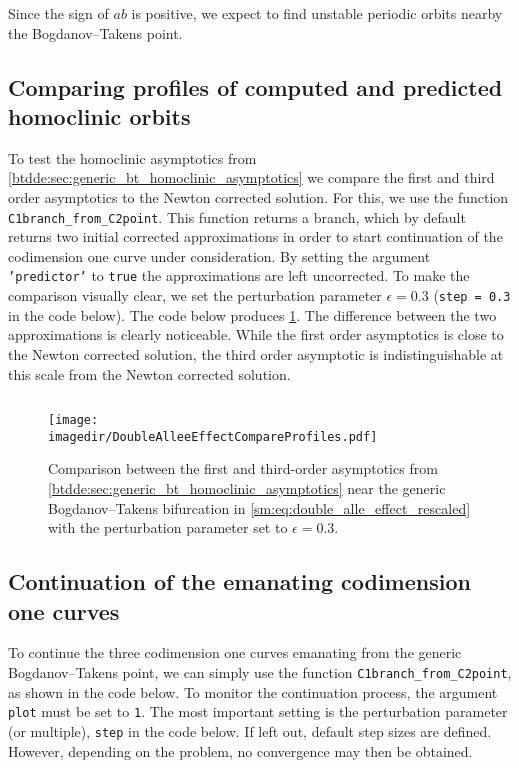 Since the sign of $ab$ is positive, we expect to find unstable periodic orbits nearby the 
Bogdanov--Takens point.

\subsection{Comparing profiles of computed and predicted homoclinic orbits}
To test the homoclinic asymptotics from
\cref{btdde:sec:generic_bt_homoclinic_asymptotics} we compare the first and third
order asymptotics to the Newton corrected solution. For this, we use the 
function \texttt{C1branch_from_C2point}. This function returns a branch, which
by default returns two initial corrected approximations in order to start continuation of the
codimension one curve under consideration. By setting the argument
\texttt{'predictor'} to \texttt{true} the approximations are left uncorrected.
To make the comparison visually clear, we set the perturbation parameter 
$\epsilon=0.3$ (\texttt{step = 0.3} in the code below).
The code below produces \cref{sm:fig:DoubleAlleeEffectCompareProfiles}.
The difference between the two approximations is clearly noticeable. While
the first order asymptotics is close to the Newton corrected solution, the third
order asymptotic is indistinguishable at this scale from the Newton corrected
solution.
\inputminted[firstline=62, lastline=80]{MATLAB}{\pathToDDEBifToolDemos/predator_prey/predator_prey.m}
\begin{figure}[ht!]
    \centering
    \texttt{[image: \\imagedir/DoubleAlleeEffectCompareProfiles.pdf]}
    \caption{Comparison between the first and third-order asymptotics from
    \cref{btdde:sec:generic_bt_homoclinic_asymptotics} near the generic
        Bogdanov--Takens bifurcation in \cref{sm:eq:double_alle_effect_rescaled} with the
        perturbation parameter set to $\epsilon=0.3$.}
    \label{sm:fig:DoubleAlleeEffectCompareProfiles}
\end{figure}

\subsection{Continuation of the emanating codimension one curves}
To continue the three codimension one curves emanating from the generic
Bogdanov--Takens point, we can simply use the function
\texttt{C1branch_from_C2point}, as shown in the code below. To monitor the
continuation process, the argument \texttt{plot} must be set to \texttt{1}.
The most important setting is the perturbation parameter (or multiple),
\texttt{step} in the code below. If left out, default step sizes are defined.
However, depending on the problem, no convergence may then be obtained.
\inputminted[firstline=82, lastline=100]{MATLAB}{\pathToDDEBifToolDemos/predator_prey/predator_prey.m}


